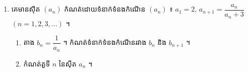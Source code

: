 \begin{enumerate}[1]
  \begin{enumerate}[a]
    \item បញ្ជាក់រក $a_n$ $(n \ge 3)$ អនុគមន៍នឹង $n$ និង $a_{n-1}$ ។
    \item បញ្ជាក់រក $S_n$ $(n \ge 2)$ អនុគមន៍នឹង $n$ និង $S_{n-1}$ ។
    \item ឧបមាថា $a_1 = 1$ រកតួទី $n$ នៃស៊ីត $S_n$ ដែល $n \ge 1$ ។
  \end{enumerate}
  \item គេមានស៊ីត $(a_n)$ កំណត់ដោយទំនាក់ទំនងកំណើន $(a_n)$ ៖ $a_1 = 2$, $a_{n+1} = \dfrac{a_n}{a_n + 3}$ $(n = 1, 2, 3, \ldots)$ ។
  \begin{enumerate}[a]
    \item តាង $b_n = \dfrac{1}{a_n}$ ។ កំណត់ទំនាក់ទំនងកំណើនរវាង $b_n$ និង $b_{n+1}$ ។
    \item កំណត់តួទី $n$ នៃស៊ីត $a_n$ ។
  \end{enumerate}
\end{enumerate}
